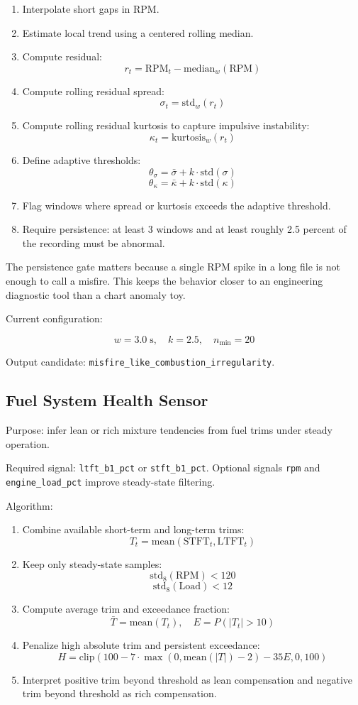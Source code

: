 \documentclass[11pt,a4paper]{article}
\begin{document}
\begin{enumerate}
\item Interpolate short gaps in RPM.
\item Estimate local trend using a centered rolling median.
\item Compute residual:
\[
r_t = \mathrm{RPM}_t - \mathrm{median}_{w}(\mathrm{RPM})
\]
\item Compute rolling residual spread:
\[
\sigma_t = \mathrm{std}_{w}(r_t)
\]
\item Compute rolling residual kurtosis to capture impulsive instability:
\[
\kappa_t = \mathrm{kurtosis}_{w}(r_t)
\]
\item Define adaptive thresholds:
\[
\theta_{\sigma} = \bar{\sigma} + k \cdot \mathrm{std}(\sigma)
\]
\[
\theta_{\kappa} = \bar{\kappa} + k \cdot \mathrm{std}(\kappa)
\]
\item Flag windows where spread or kurtosis exceeds the adaptive threshold.
\item Require persistence: at least 3 windows and at least roughly 2.5 percent of the recording must be abnormal.
\end{enumerate}

The persistence gate matters because a single RPM spike in a long file is not enough to call a misfire. This keeps the behavior closer to an engineering diagnostic tool than a chart anomaly toy.

Current configuration:

\[
w = 3.0 \; \mathrm{s}, \quad k = 2.5, \quad n_{\min}=20
\]

Output candidate: \texttt{misfire\_like\_combustion\_irregularity}.

\subsection{Fuel System Health Sensor}

Purpose: infer lean or rich mixture tendencies from fuel trims under steady operation.

Required signal: \texttt{ltft\_b1\_pct} or \texttt{stft\_b1\_pct}. Optional signals \texttt{rpm} and \texttt{engine\_load\_pct} improve steady-state filtering.

Algorithm:

\begin{enumerate}
\item Combine available short-term and long-term trims:
\[
T_t = \mathrm{mean}(\mathrm{STFT}_t, \mathrm{LTFT}_t)
\]
\item Keep only steady-state samples:
\[
\mathrm{std}_{8}(\mathrm{RPM}) < 120
\]
\[
\mathrm{std}_{8}(\mathrm{Load}) < 12
\]
\item Compute average trim and exceedance fraction:
\[
\bar{T} = \mathrm{mean}(T_t), \quad E = P(|T_t| > 10)
\]
\item Penalize high absolute trim and persistent exceedance:
\[
H = \mathrm{clip}(100 - 7 \cdot \max(0, \mathrm{mean}(|T|)-2) - 35E, 0, 100)
\]
\item Interpret positive trim beyond threshold as lean compensation and negative trim beyond threshold as rich compensation.
\end{enumerate}
\end{document}
